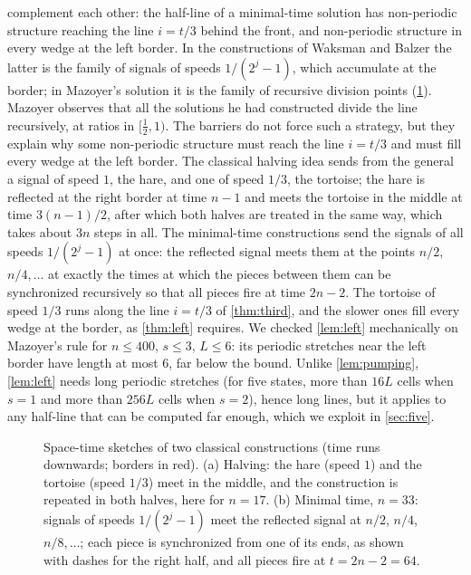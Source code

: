  complement each other: the half-line of a
minimal-time solution has non-periodic structure reaching the line $i=t/3$
behind the front, and non-periodic structure in every wedge at the left
border. In the constructions of Waksman and Balzer the latter is the family
of signals of speeds $1/(2^j-1)$, which accumulate at the border; in
Mazoyer's solution it is the family of recursive division points
(\cref{fig:hare}). Mazoyer \cite[\S2]{Mazoyer96} observes that all the solutions he
had constructed divide the line recursively, at ratios in $[\frac12,1)$.
The barriers do not force such a strategy, but they explain why some
non-periodic structure must reach the line $i=t/3$ and must fill every
wedge at the left border. The classical halving idea \cite{Minsky67} sends from
the general a signal of speed $1$, the hare, and one of speed $1/3$, the
tortoise; the hare is reflected at the right border at time $n-1$ and meets
the tortoise in the middle at time $3(n-1)/2$, after which both halves are
treated in the same way, which takes about $3n$ steps in all. The
minimal-time constructions send the signals of all speeds $1/(2^j-1)$ at
once: the reflected signal meets them at the points $n/2$, $n/4,\dots$ at
exactly the times at which the pieces between them can be synchronized
recursively so that all pieces fire at time $2n-2$. The tortoise of speed
$1/3$ runs along the line $i=t/3$ of \cref{thm:third}, and the slower ones
fill every wedge at the border, as \cref{thm:left} requires. We checked
\cref{lem:left} mechanically on Mazoyer's rule for $n\le400$, $s\le3$,
$L\le6$: its periodic stretches near the left border have length at most
$6$, far below the bound. Unlike \cref{lem:pumping}, \cref{lem:left} needs
long periodic stretches (for five states, more than $16L$ cells when $s=1$
and more than $256L$ cells when $s=2$), hence long lines, but it applies to
any half-line that can be computed far enough, which we exploit in
\cref{sec:five}.

\begin{figure}[t]
\centering

\caption{Space-time sketches of two classical constructions (time runs
downwards; borders in red). (a) Halving: the hare (speed $1$) and the
tortoise (speed $1/3$) meet in the middle, and the construction is repeated
in both halves, here for $n=17$. (b) Minimal time, $n=33$: signals of
speeds $1/(2^j-1)$ meet the reflected signal at $n/2$, $n/4$,
$n/8,\dots$; each piece is synchronized from one of its ends, as shown with
dashes for the right half, and all pieces fire at $t=2n-2=64$.}
\label{fig:hare}
\end{figure}
